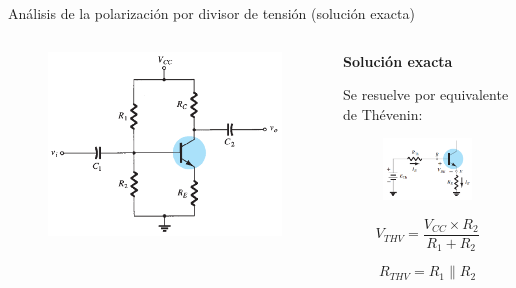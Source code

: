 \documentclass[t,aspectratio=169]{beamer}
\begin{document}
\begin{frame}{Análisis de la polarización por divisor de tensión (solución exacta)}

\begin{columns}
\begin{column}{0.5\textwidth}

\begin{figure}
    \centering
    \includegraphics[width=\textwidth]{figures/polarizacion_divisor_tension.png}
\end{figure}

\end{column}
\begin{column}{0.5\textwidth}

\textbf{Solución exacta}

Se resuelve por equivalente de Thévenin:

\begin{figure}
    \centering
    \includegraphics[width=5cm]{figures/polarizacion_divisor_thevenin.png}
\end{figure}
%
\[ V_{THV} = \dfrac{V_{CC} \times R_2}{R_1 + R_2} \]

\[ R_{THV} = R_1 \parallel R_2 \]

\end{column}
\end{columns}

\end{frame}
\end{document}
